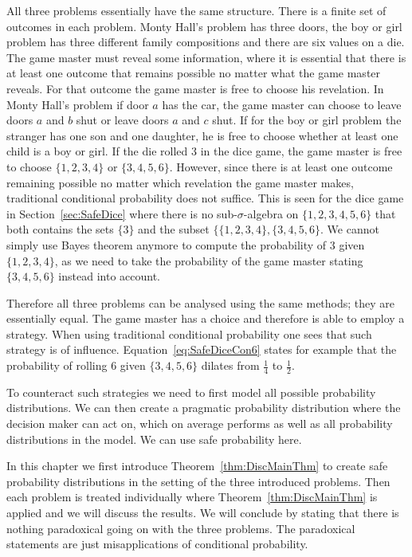 \documentclass[a4paper]{report}
\theoremstyle{plain}
\theoremstyle{definition}
\theoremstyle{remark}
\numberwithin{equation}{chapter}
\DeclareMathOperator{\1}{\mathbbm{1}}
\begin{document}
All three problems essentially have the same structure. There is a finite set of outcomes in each problem. Monty Hall's problem has three doors, the boy or girl problem has three different family compositions and there are six values on a die. The game master must reveal some information, where it is essential that there is at least one outcome that remains possible no matter what the game master reveals. For that outcome the game master is free to choose his revelation. In Monty Hall's problem if door $a$ has the car, the game master can choose to leave doors $a$ and $b$ shut or leave doors $a$ and $c$ shut. If for the boy or girl problem the stranger has one son and one daughter, he is free to choose whether at least one child is a boy or girl. If the die rolled 3 in the dice game, the game master is free to choose $\{1,2,3,4\}$ or $\{3,4,5,6\}$. However, since there is at least one outcome remaining possible no matter which revelation the game master makes, traditional conditional probability does not suffice. This is seen for the dice game in Section~\ref{sec:SafeDice} where there is no sub-$\sigma$-algebra on $\{1,2,3,4,5,6\}$ that both contains the sets $\{3\}$ and the subset $\{\{1,2,3,4\},\{3,4,5,6\}$. We cannot simply use Bayes theorem anymore to compute the probability of $3$ given $\{1,2,3,4\}$, as we need to take the probability of the game master stating $\{3,4,5,6\}$ instead into account.

Therefore all three problems can be analysed using the same methods; they are essentially equal. The game master has a choice and therefore is able to employ a strategy. When using traditional conditional probability one sees that such strategy is of influence. Equation~\ref{eq:SafeDiceCon6} states for example that the probability of rolling $6$ given $\{3,4,5,6\}$ dilates from $\frac{1}{4}$ to $\frac{1}{2}$.

To counteract such strategies we need to first model all possible probability distributions. We can then create a pragmatic probability distribution where the decision maker can act on, which on average performs as well as all probability distributions in the model. We can use safe probability here.

In this chapter we first introduce Theorem~\ref{thm:DiscMainThm} to create safe probability distributions in the setting of the three introduced problems. Then each problem is treated individually where Theorem~\ref{thm:DiscMainThm} is applied and we will discuss the results. We will conclude by stating that there is nothing paradoxical going on with the three problems. The paradoxical statements are just misapplications of conditional probability.
\end{document}
